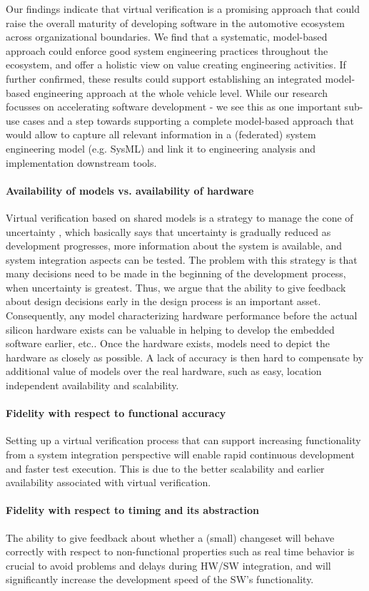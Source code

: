Our findings indicate that virtual verification is a promising approach that could raise the overall maturity of developing software in the automotive ecosystem across organizational boundaries. We find that a systematic, model-based approach could enforce good system engineering practices throughout the ecosystem, and offer a holistic view on value creating engineering activities. If further confirmed, these results could support establishing an integrated model-based engineering approach at the whole vehicle level. While our research focusses on accelerating software development - we see this as one important sub-use cases and a step towards supporting a complete model-based approach that would allow to capture all relevant information in a (federated) system engineering model (e.g. SysML) and link it to engineering analysis and implementation downstream tools.

\paragraph{Availability of models vs. availability of hardware}
Virtual verification based on shared models is a strategy to manage the cone of uncertainty \cite{Boehm1981}, which basically says that uncertainty is gradually reduced as development progresses, more information about the system is available, and system integration aspects can be tested. The problem with this strategy is that many decisions need to be made in the beginning of the development process, when uncertainty is greatest. Thus, we argue that the ability to give feedback about design decisions early in the design process is an important asset. Consequently, any model characterizing hardware performance before the actual silicon hardware exists can be valuable in helping to develop the embedded software earlier, etc.. Once the hardware exists, models need to depict the hardware as closely as possible. A lack of accuracy is then hard to compensate by additional value of models over the real hardware, such as easy, location independent availability and scalability.

\paragraph{Fidelity with respect to functional accuracy}
Setting up a virtual verification process  that can support increasing functionality from a system integration perspective will enable rapid continuous development and faster test execution. This is due to the better scalability and earlier availability associated with virtual verification.

\paragraph{Fidelity with respect to timing and its abstraction}
The ability to give feedback about whether a (small) changeset will behave correctly with respect to non-functional properties such as real time behavior is crucial to avoid problems and delays during HW/SW integration, and will significantly increase the development speed of the SW’s functionality.

